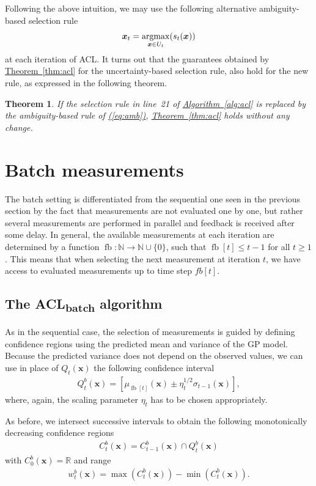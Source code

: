 \documentclass{article}
\def\*#1{\bm{#1}}
\newcommand{\algoref}[1]{\hyperref[#1]{\mbox{Algorithm~\ref*{#1}}}}
\newcommand{\theoremref}[1]{\hyperref[#1]{\mbox{Theorem~\ref*{#1}}}}
\newcommand{\eqtref}[1]{\hyperref[#1]{\mbox{(\ref*{#1})}}}
\newcommand{\argmax}{\operatornamewithlimits{argmax}}
\newtheorem{theorem}{Theorem}
\newcommand{\acl}{\textsf{ACL}\xspace}
\newcommand{\bacl}{\textsf{ACL\textsubscript{batch}}\xspace}
\newcommand{\fb}{\mathop{\mathrm{fb}}}
\begin{document}
Following the above intuition, we may use the following alternative
ambiguity-based selection rule
\begin{align}
\label{eq:amb}
\*x_t = \argmax_{\*x\in U_t}(s_t(\*x))
\end{align}
at each iteration of \acl. It turns out that the guarantees obtained by
\theoremref{thm:acl} for the uncertainty-based selection rule, also hold
for the new rule, as expressed in the following theorem.

\begin{theorem}
\label{thm:amb}
If the selection rule in line~21 of \algoref{alg:acl} is replaced by the
ambiguity-based rule of \eqtref{eq:amb}, \theoremref{thm:acl} holds without
any change.
\end{theorem}

\section{Batch measurements}
The batch setting is differentiated from the sequential one seen in the
previous section by the
fact that measurements are not evaluated one by one, but rather several
measurements are performed in parallel and feedback is received after
some delay. In general, the available measurements at each iteration
are determined by a function
$\fb : \mathbb{N} \to \mathbb{N}\cup\{0\}$, such that
$\fb[t] \leq t-1$ for all $t \geq 1$. This means that when selecting
the next measurement at iteration $t$, we have access to evaluated
measurements up to time step $fb[t]$.

\subsection{The \bacl algorithm}
As in the sequential case, the selection of measurements is guided by
defining confidence regions using the predicted mean and variance of
the GP model. Because the predicted variance does not depend on the
observed values, we can use in place of $Q_t(\*x)$ the following
confidence interval
\begin{align*}
Q_t^b(\*x) = \left[\mu_{\fb[t]}(\*x) \pm \eta_t^{1/2}\sigma_{t-1}(\*x)\right],
\end{align*}
where, again, the scaling parameter $\eta_t$ has to be chosen appropriately.

As before, we intersect successive intervals to obtain the following
monotonically decreasing confidence regions
\begin{align*}
C_t^b(\*x) = C_{t-1}^b(\*x) \cap Q_t^b(\*x)
\end{align*}
with $C_0^b(\*x) = \mathbb{R}$ and range
\begin{align*}
w_t^b(\*x) = \max(C_t^b(\*x)) - \min(C_t^b(\*x)).
\end{align*}
\end{document}
